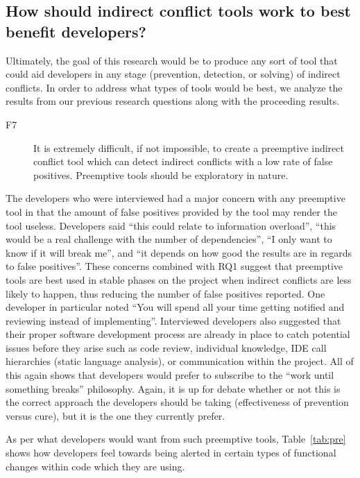 \documentclass[conference]{IEEEtran}
\makeatletter
\def\namedlabel#1#2{\begingroup
   \def\@currentlabel{#2}%
   \label{#1}\endgroup
}
\makeatother
\begin{document}
\subsection{How should indirect conflict tools work to best benefit developers?}
Ultimately, the goal of this research would be to produce any sort of tool that could aid developers in any stage (prevention, detection, or
solving) of indirect conflicts. In order to address what types of tools would be best, we analyze the results from our previous research
questions along with the proceeding results.

\begin{description}
	\item[F7\namedlabel{itm:f7}{F7}] It is extremely difficult, if not impossible, to create a preemptive indirect 
																	 conflict tool which can detect indirect conflicts with a low rate of false positives. Preemptive tools 
																	 should be exploratory in nature.
\end{description}

The developers who were interviewed had a major concern with any preemptive tool in that the amount of false positives
provided by the tool may render the tool useless. Developers said ``this could relate to information overload'', ``this would
be a real challenge with the number of dependencies'', ``I only want to know if it will break me'', and ``it depends on how
good the results are in regards to false positives''. These concerns combined with RQ1 suggest that preemptive tools are
best used in stable phases on the project when indirect conflicts are less likely to happen, thus reducing the number of false
positives reported. One developer in particular noted ``You will spend all your time getting notified and reviewing instead of implementing''.
Interviewed developers also suggested that their proper software development process are already in place to
catch potential issues before they arise such as code review, individual knowledge, IDE call hierarchies (static language analysis),
or communication within the project. All of this again shows that developers would prefer to subscribe to the 
``work until something breaks'' philosophy. Again, it is up for debate whether or not this is the correct approach the developers should
be taking (effectiveness of prevention versus cure), but it is the one they currently prefer.

As per what developers would want from such preemptive tools, Table~\ref{tab:pre} shows how developers feel towards being 
alerted in certain types of functional changes within code which they are using.
\end{document}

